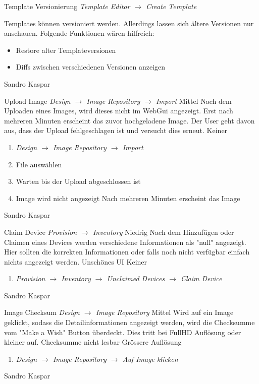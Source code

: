 \featureRequest
{Template Versionierung}
{\textit{Template Editor $\rightarrow$ Create Template}}
{Templates können versioniert werden. Allerdings lassen sich ältere Versionen nur anschauen. Folgende Funktionen wären hilfreich:
\begin{itemize}
	\item Restore alter Templateversionen
	\item Diffs zwischen verschiedenen Versionen anzeigen
\end{itemize}
}
{Sandro Kaspar}
{}

\bugreport
{Upload Image}
{\textit{Design $\rightarrow$ Image Repository $\rightarrow$ Import}}
{Mittel}
{Nach dem Uploaden eines Images, wird dieses nicht im WebGui angezeigt. Erst nach mehreren Minuten erscheint das zuvor hochgeladene Image.
}
{Der User geht davon aus, dass der Upload fehlgeschlagen ist und versucht dies erneut.}
{Keiner}
{
	\begin{enumerate}
		\item \textit{Design $\rightarrow$ Image Repository $\rightarrow$ Import}
		\item File auswählen
		\item Warten bis der Upload abgeschlossen ist
		\item Image wird nicht angezeigt
		\subitem Nach mehreren Minuten erscheint das Image
	\end{enumerate}
}
{Sandro Kaspar}
{}


\bugreport
{Claim Device}
{\textit{Provision $\rightarrow$ Inventory}}
{Niedrig}
{Nach dem Hinzufügen oder Claimen eines Devices werden verschiedene Informationen als "null" angezeigt. Hier sollten die korrekten Informationen oder falls noch nicht verfügbar einfach nichts angezeigt werden.
}
{Unschönes UI}
{Keiner}
{
	\begin{enumerate}
		\item \textit{Provision $\rightarrow$ Inventory $\rightarrow$ Unclaimed Devices $\rightarrow$ Claim Device}
	\end{enumerate}
}
{Sandro Kaspar}
{}

\bugreport
{Image Checksum}
{\textit{Design $\rightarrow$ Image Repository}}
{Mittel}
{Wird auf ein Image geklickt, sodass die Detailinformationen angezeigt werden, wird die Checksumme vom "Make a Wish" Button überdeckt. Dies tritt bei FullHD Auflösung oder kleiner auf.
}
{Checksumme nicht lesbar}
{Grössere Auflösung}
{
	\begin{enumerate}
		\item \textit{Design $\rightarrow$ Image Repository $\rightarrow$ Auf Image klicken}
	\end{enumerate}
}
{Sandro Kaspar}
{}
